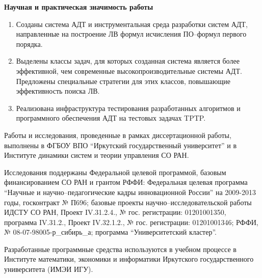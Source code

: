 \documentclass[a4paper]{report}
\begin{document}
\textbf{Научная и практическая значимость работы}
\begin{enumerate}
\item Созданы система АДТ и инструментальная среда разработки систем АДТ, направленные на построение ЛВ формул исчисления ПО--формул первого порядка.
\item Выделены классы задач, для которых созданная система является более эффективной, чем современные высокопроизводительные системы АДТ. Предложены специальные стратегии для этих классов, повышающие эффективность поиска ЛВ.
\item Реализована инфраструктура тестирования разработанных алгоритмов и программного обеспечения АДТ на тестовых задачах TPTP. %
\end{enumerate}


Работы и исследования, проведенные в рамках  диссертационной работы, выполнены в ФГБОУ ВПО ``Иркутский государственный университет'' и в Институте динамики систем и теории управления СО РАН.

Исследования поддержаны Федеральной целевой программой, базовым финансированием СО РАН и грантом РФФИ:
Федеральная целевая программа ``Научные и научно--педагогические кадры инновационной России'' на 2009-2013 годы, госконтракт № П696;
базовые проекты научно--исследовательской работы ИДСТУ СО РАН, Проект IV.31.2.4., № гос. регистрации: 01201001350, программа IV.31.2., Проект IV.32.1.2., № гос. регистрации: 01201001346;
РФФИ, № 08-07-98005-р\_сибирь\_а;
программа ``Университетский кластер''.

Разработанные программные средства используются в учебном процессе в Институте математики, экономики и информатики Иркутского государственного университета (ИМЭИ ИГУ). %
\end{document}
